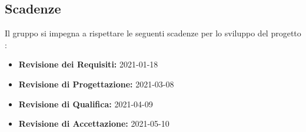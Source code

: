 \subsection{Scadenze}
\label{sub:scadenze_fissate}
Il gruppo {\Gruppo} si impegna a rispettare le seguenti scadenze per lo sviluppo del progetto \NomeProgetto:
\begin{itemize}
    \item \textbf{Revisione dei Requisiti:} 2021-01-18
    \item \textbf{Revisione di Progettazione:} 2021-03-08
    \item \textbf{Revisione di Qualifica:} 2021-04-09
    \item \textbf{Revisione di Accettazione:} 2021-05-10
\end{itemize}
